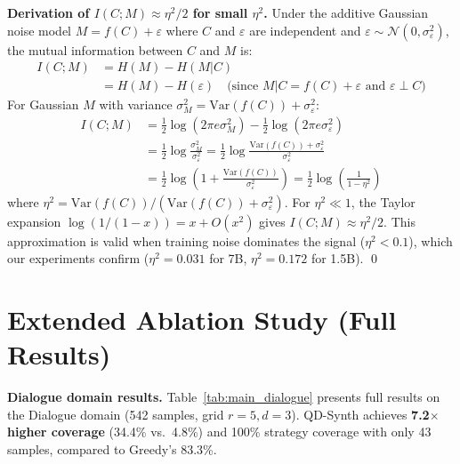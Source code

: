 \documentclass{article}
\theoremstyle{plain}
\theoremstyle{remark}
\begin{document}
\textbf{Derivation of $I(C;M) \approx \eta^2/2$ for small $\eta^2$.}
Under the additive Gaussian noise model $M = f(C) + \varepsilon$ where $C$ and $\varepsilon$ are independent and $\varepsilon \sim \mathcal{N}(0, \sigma^2_\varepsilon)$, the mutual information between $C$ and $M$ is:
\begin{align*}
I(C; M) &= H(M) - H(M|C) \\
&= H(M) - H(\varepsilon) \quad \text{(since } M|C = f(C) + \varepsilon \text{ and } \varepsilon \perp C\text{)}
\end{align*}
For Gaussian $M$ with variance $\sigma^2_M = \text{Var}(f(C)) + \sigma^2_\varepsilon$:
\begin{align*}
I(C; M) &= \frac{1}{2}\log(2\pi e \sigma^2_M) - \frac{1}{2}\log(2\pi e \sigma^2_\varepsilon) \\
&= \frac{1}{2}\log\frac{\sigma^2_M}{\sigma^2_\varepsilon} = \frac{1}{2}\log\frac{\text{Var}(f(C)) + \sigma^2_\varepsilon}{\sigma^2_\varepsilon} \\
&= \frac{1}{2}\log\left(1 + \frac{\text{Var}(f(C))}{\sigma^2_\varepsilon}\right) = \frac{1}{2}\log\left(\frac{1}{1 - \eta^2}\right)
\end{align*}
where $\eta^2 = \text{Var}(f(C))/(\text{Var}(f(C)) + \sigma^2_\varepsilon)$.
For $\eta^2 \ll 1$, the Taylor expansion $\log(1/(1-x)) = x + O(x^2)$ gives $I(C; M) \approx \eta^2/2$.
This approximation is valid when training noise dominates the signal ($\eta^2 < 0.1$), which our experiments confirm ($\eta^2 = 0.031$ for 7B, $\eta^2 = 0.172$ for 1.5B).
\qed

\section{Extended Ablation Study (Full Results)}
\label{sec:app_ablation}

\textbf{Dialogue domain results.}
Table~\ref{tab:main_dialogue} presents full results on the Dialogue domain (542 samples, grid $r{=}5, d{=}3$).
QD-Synth achieves \textbf{7.2$\times$ higher coverage} (34.4\% vs.\ 4.8\%) and 100\% strategy coverage with only 43 samples, compared to Greedy's 83.3\%.
\end{document}
